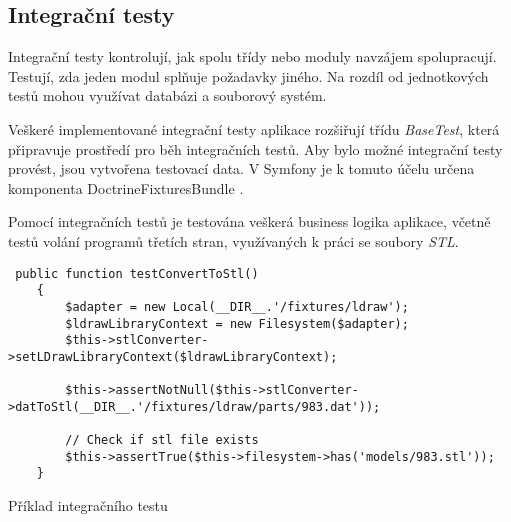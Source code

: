 \subsection{Integrační testy}
Integrační testy kontrolují, jak spolu třídy nebo moduly navzájem spolupracují. Testují, zda jeden modul splňuje požadavky jiného. Na rozdíl od jednotkových testů mohou využívat databázi a  souborový systém. \autocite{zdrojak:testy}

Veškeré implementované integrační testy aplikace rozšiřují třídu \textit{BaseTest}, která připravuje prostředí pro běh integračních testů. Aby bylo možné integrační testy provést, jsou vytvořena testovací data. V Symfony je k tomuto účelu určena komponenta DoctrineFixturesBundle \autocite{doctrine:fixtures}. 

Pomocí integračních testů je testována veškerá business logika aplikace, včetně testů volání programů třetích stran, využívaných k práci se soubory \textit{STL}.

\begin{listing}[htbp]
        \begin{verbatim}
 public function testConvertToStl()
    {
        $adapter = new Local(__DIR__.'/fixtures/ldraw');
        $ldrawLibraryContext = new Filesystem($adapter);
        $this->stlConverter->setLDrawLibraryContext($ldrawLibraryContext);

        $this->assertNotNull($this->stlConverter->datToStl(__DIR__.'/fixtures/ldraw/parts/983.dat'));
        
        // Check if stl file exists
        $this->assertTrue($this->filesystem->has('models/983.stl'));
    }
         \end{verbatim}
    \caption{Příklad integračního testu \label{phpunit-integracni}}
\end{listing}
